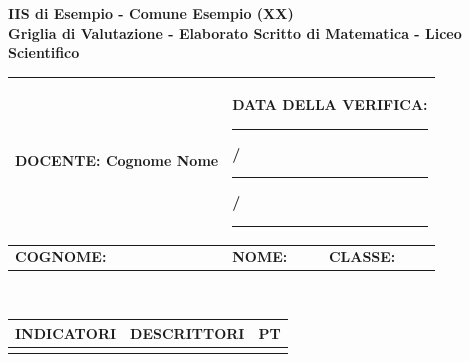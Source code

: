

\newpage

\renewcommand{\arraystretch}{1.3}
\vspace*{-5em} 

\begin{center}
    \textbf{IIS di Esempio - Comune Esempio (XX)}\\
    \textbf{Griglia di Valutazione - Elaborato Scritto di Matematica - Liceo Scientifico}
\end{center}
\begin{tabularx}{\textwidth}{|m{6.8cm}|m{5.6cm}|m{3.5cm}|}
\hline
\textbf{DOCENTE:} Cognome Nome &
\multicolumn{2}{|l|}{\textbf{DATA DELLA VERIFICA:} \rule{1.15cm}{0.4pt}/\rule{1.15cm}{0.4pt}/\rule{1.25cm}{0.4pt}}\\
\hline
\textbf{COGNOME:} &
\textbf{NOME:} &
\textbf{CLASSE:} \\
\hline
\end{tabularx}
\\
\thispagestyle{empty}

\vspace{1mm}

\begin{tabularx}{\textwidth}{|>{\centering}m{}|>{\centering\arraybackslash}m{11.6cm}|>{\centering\arraybackslash}m{0.8cm}|}
\hline
\textbf{INDICATORI} & \textbf{DESCRITTORI} & \textbf{PT}\\
\hline
\renewcommand{\arraystretch}{0.5}
&&\\
\end{tabularx}

\vspace{-0.75cm} %

